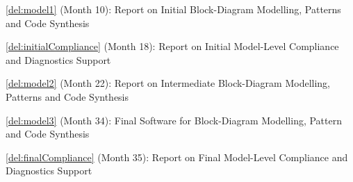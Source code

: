 \begin{Workpackage}{\thewpno}
\begin{WPDeliverables}
\begin{compactitem}
\item \ref{del:model1} (Month 10): Report on Initial Block-Diagram Modelling, Patterns and Code Synthesis
\item \ref{del:initialCompliance} (Month 18): Report on Initial Model-Level Compliance and Diagnostics Support
\item \ref{del:model2} (Month 22): Report on Intermediate Block-Diagram Modelling, Patterns and Code Synthesis
\item \ref{del:model3} (Month 34):  Final Software for Block-Diagram Modelling, Pattern and Code Synthesis
\item \ref{del:finalCompliance} (Month 35): Report on Final Model-Level Compliance and Diagnostics Support
\end{compactitem}
\end{WPDeliverables}
\end{Workpackage}
